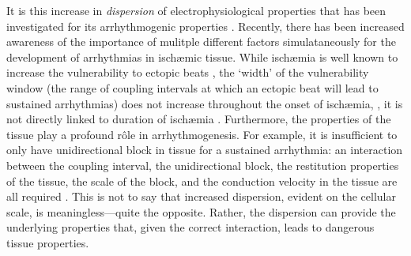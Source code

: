 \documentclass[../thesis-main.tex]{subfiles}
\begin{document}
 It is this increase in \emph{dispersion} of electrophysiological properties that has been investigated for its arrhythmogenic properties \citep{Kuo1983}. Recently, there has been increased awareness of the importance of mulitple different factors simulataneously for the development of arrhythmias in isch\ae mic tissue. While isch\ae mia is well known to increase the vulnerability to ectopic beats \citep{Zhang2011}, the `width' of the vulnerability window (the range of coupling intervals at which an ectopic beat will lead to sustained arrhythmias) does not increase throughout the onset of isch\ae mia, \idest, it is not directly linked to duration of isch\ae mia \citep{Tice2007, Romero2009a}. Furthermore, the properties of the tissue play a profound r\^ole in arrhythmogenesis. For example, it is insufficient to only have unidirectional block in tissue for a sustained arrhythmia: an interaction between the coupling interval, the unidirectional block, the restitution properties of the tissue, the scale of the block, and the conduction velocity in the tissue are all required \citep{Coronel2009}. This is not to say that increased dispersion, evident on the cellular scale, is meaningless---quite the opposite. Rather, the dispersion can provide the underlying properties that, given the correct interaction, leads to dangerous tissue properties.
 
\end{document}
